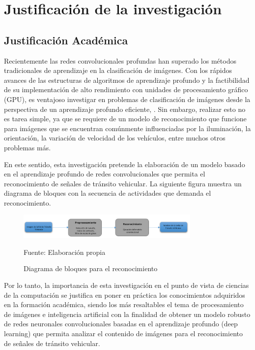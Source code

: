 	
\section{Justificación de la investigación} 

	\subsection{Justificación Académica}

	Recientemente las redes convolucionales profundas han superado los métodos tradicionales de aprendizaje en la clasificación de imágenes. Con los rápidos avances de las estructuras de algoritmos de aprendizaje profundo y la factibilidad de su implementación de alto rendimiento con unidades de procesamiento gráfico (GPU), es ventajoso investigar en problemas de clasificación de imágenes desde la perspectiva de un aprendizaje profundo eficiente, \citep{recentCNN}. Sin embargo, realizar esto no es tarea simple, ya que se requiere de un modelo de reconocimiento que funcione para imágenes que se encuentran comúnmente influenciadas por la iluminación, la orientación, la variación de velocidad de los vehículos, entre muchos otros problemas más.  \vskip 0.2cm

	En este sentido, esta investigación pretende la elaboración de un modelo basado en el aprendizaje profundo de redes convolucionales que permita el reconocimiento de señales de tránsito vehicular. La siguiente figura muestra un diagrama de bloques con la secuencia de actividades que demanda el reconocimiento.

	\begin{figure}[H]
	\begin{center}
	\includegraphics[width=0.8\textwidth]{images/intro/bloque}
	\end{center}
	\begin{center}
	\caption{\small{Diagrama de bloques para el reconocimiento}}
	{\small{Fuente: Elaboración propia}}
	\end{center}
	\vspace{-1.5em}
	\end{figure}


	Por lo tanto, la importancia de esta investigación en el punto de vista de ciencias de la computación se justifica en poner en práctica los conocimientos adquiridos en la formación académica, siendo los más resaltables el tema de procesamiento de imágenes e inteligencia artificial con la finalidad de obtener un modelo robusto de redes neuronales convolucionales basadas en el aprendizaje profundo (deep learning) que permita analizar el contenido de imágenes para el reconocimiento de señales de tránsito vehicular. 


